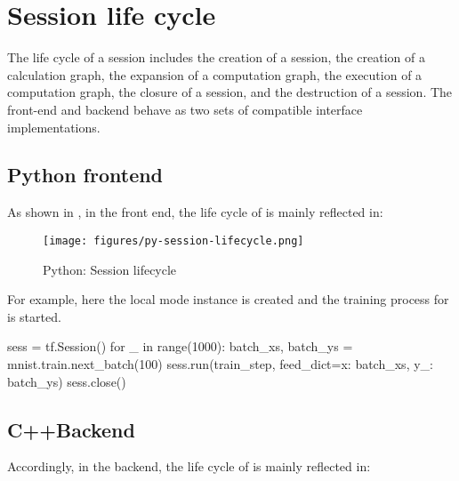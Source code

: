 \section{Session life cycle}
\begin{content}
The life cycle of a session includes the creation of a session, the creation of a calculation graph, the expansion of a computation graph, the execution of a computation graph, the closure of a session, and the destruction of a session. The front-end  and backend\cpp{} behave as two sets of compatible interface implementations.


\subsection{Python frontend}
As shown in , in the  front end, the life cycle of  is mainly reflected in:

\begin{enum}
    \begin{enum}
    \end{enum}
\end{enum}

\begin{figure}[H]
  \centering
  \texttt{[image: figures/py-session-lifecycle.png]}
  \caption{Python: Session lifecycle}
  \label{fig:py-session-lifecycle}
\end{figure}

For example, here the local mode  instance is created and the training process for  is started.

\begin{leftbar}
\begin{python}
sess = tf.Session()
for _ in range(1000):
  batch_xs, batch_ys = mnist.train.next_batch(100)
  sess.run(train_step, feed_dict={x: batch_xs, y_: batch_ys})
sess.close()
\end{python}
\end{leftbar}


\subsection{C++Backend}
Accordingly, in the \cpp{} backend, the life cycle of  is mainly reflected in:


\end{content}
